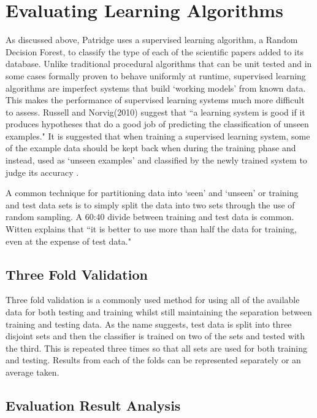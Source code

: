 \section{ Evaluating Learning Algorithms }
\label{sec:evaluation_learners}

As discussed above, Patridge uses a supervised learning algorithm, a Random
Decision Forest, to classify the type of each of the scientific papers added to
its database. Unlike traditional procedural algorithms that can be unit tested
and in some cases formally proven to behave uniformly at
runtime\cite{filliatre2007formal}, supervised learning algorithms are imperfect
systems that build `working models' from known data. This makes the performance
of supervised learning systems much more difficult to assess. Russell and
Norvig(2010) suggest that ``a learning system is good if it produces hypotheses
that do a good job of predicting the classification of unseen
examples\cite{russell2010artificial}." It is suggested that when training a
supervised learning system, some of the example data should be kept back when
during the training phase and instead, used as `unseen examples' and classified
by the newly trained system to judge its accuracy
\cite{alpaydin2004introduction}\cite{russell2010artificial}.

A common technique for partitioning data into `seen' and `unseen' or training
and test data sets is to simply split the data into two sets through the use of
random sampling.  A 60:40 divide between training and test data is common.
Witten explains that ``it is better to use more than half the data for
training, even at the expense of test data\cite{witten2005data}." 

\subsection{ Three Fold Validation }

Three fold validation is a commonly used method for using all of the available
data for both testing and training whilst still maintaining the separation
between training and testing data. As the name suggests, test data is split
into three disjoint sets and then the classifier is trained on two of the sets
and tested with the third. This is repeated three times so that all sets are
used for both training and testing. Results from each of the folds can be
represented separately or an average taken.

\subsection{ Evaluation Result Analysis } 

